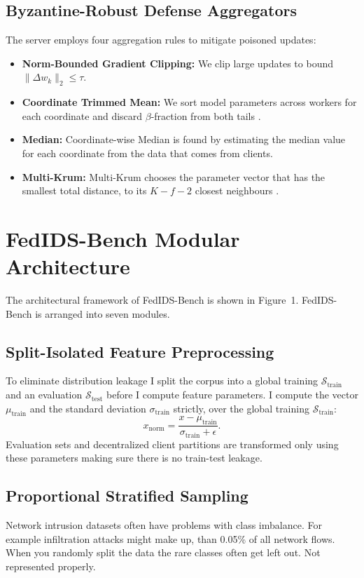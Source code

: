 \documentclass[runningheads]{llncs}
\begin{document}
\subsection{Byzantine-Robust Defense Aggregators}
The server employs four aggregation rules to mitigate poisoned updates:
\begin{itemize}
    \item \textbf{Norm-Bounded Gradient Clipping:} We clip large updates to bound $\|\Delta w_k\|_2 \leq \tau$.
    \item \textbf{Coordinate Trimmed Mean:} We sort model parameters across workers for each coordinate and discard $\beta$-fraction from both tails \cite{yin2018byzantine}.
    \item \textbf{Median:} Coordinate-wise Median is found by estimating the median value for each coordinate from the data that comes from clients.
    \item \textbf{Multi-Krum:} Multi-Krum chooses the parameter vector that has the smallest total distance, to its $K - f - 2$ closest neighbours \cite{blanchard2017machine}.
\end{itemize}

\section{FedIDS-Bench Modular Architecture}
\label{sec:architecture}

The architectural framework of FedIDS-Bench is shown in Figure~1. FedIDS-Bench is arranged into seven modules.

\subsection{Split-Isolated Feature Preprocessing}
To eliminate distribution leakage I split the corpus into a global training $\mathcal{S}_{\text{train}}$ and an evaluation $\mathcal{S}_{\text{test}}$ before I compute feature parameters. I compute the vector $\mu_{\text{train}}$ and the standard deviation $\sigma_{\text{train}}$ strictly, over the global training $\mathcal{S}_{\text{train}}$:
\begin{equation}
x_{\text{norm}} = \frac{x - \mu_{\text{train}}}{\sigma_{\text{train}} + \epsilon}.
\end{equation}
Evaluation sets and decentralized client partitions are transformed only using these parameters making sure there is no train-test leakage.

\subsection{Proportional Stratified Sampling}
Network intrusion datasets often have problems with class imbalance. For example infiltration attacks might make up, than 0.05\% of all network flows. When you randomly split the data the rare classes often get left out. Not represented properly.
\end{document}
